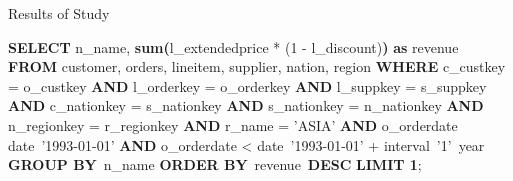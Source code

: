 \documentclass{beamer}
\begin{document}
\begin{frame}{Results of Study}
\scriptsize{
\begin{algorithmic}[1]
\textbf{SELECT}  n\_name,
	\textbf{sum(}l\_extendedprice * (1 - l\_discount)\textbf{)} \textbf{as} revenue \linebreak
\textbf{FROM} customer, orders,	lineitem,	supplier, nation,
	region\linebreak
\textbf{WHERE}
	c\_custkey = o\_custkey\linebreak
	\textbf{AND} l\_orderkey = o\_orderkey\linebreak
	\textbf{AND} l\_suppkey = s\_suppkey\linebreak
	\textbf{AND} c\_nationkey = s\_nationkey\linebreak
	\textbf{AND} s\_nationkey = n\_nationkey\linebreak
	\textbf{AND} n\_regionkey = r\_regionkey\linebreak
	\textbf{AND} r\_name = 'ASIA'\linebreak
	\textbf{AND} o\_orderdate \geq date\  '1993-01-01'\linebreak
	\textbf{AND} o\_orderdate < date\ '1993-01-01' + interval\ '1'\ year\linebreak
\textbf{GROUP BY}\ n\_name\linebreak
\textbf{ORDER BY}\ revenue\ \textbf{DESC}\linebreak
\textbf{LIMIT 1};
\end{algorithmic}
}

\end{frame}
\end{document}
